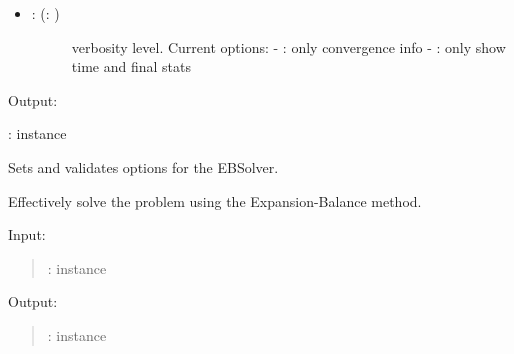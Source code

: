 \documentclass[a4paper,10pt,english]{sphinxmanual}
\begin{document}
\begin{fulllineitems}
\begin{description}
\begin{itemize}
\begin{description}
\end{description}

\item {} \begin{description}
\item[{: (: )}] \leavevmode
verbosity level. Current options:
- : only convergence info
- : only show time and final stats

\end{description}

\end{itemize}

\end{description}

Output:

:  instance

\begin{fulllineitems}
\label{\detokenize{skprocrustes:skprocrustes.EBSolver._setoptions}}
Sets and validates options for the EBSolver.


\end{fulllineitems}


\begin{fulllineitems}
\label{\detokenize{skprocrustes:skprocrustes.EBSolver.solve}}
Effectively solve the problem using the Expansion-Balance method.

Input:
\begin{quote}

:  instance
\end{quote}

Output:
\begin{quote}

:  instance
\end{quote}

\end{fulllineitems}


\end{fulllineitems}
\end{document}
